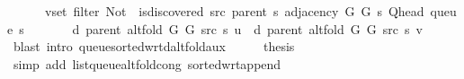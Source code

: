 \begin{isabellebody}
\ \ \ \ \ \ {\isasymforall}v{\isasymin}set\ {\isacharparenleft}{\kern0pt}filter\ {\isacharparenleft}{\kern0pt}Not\ {\isasymcirc}\ is{\isacharunderscore}{\kern0pt}discovered\ src\ {\isacharparenleft}{\kern0pt}parent\ s{\isacharparenright}{\kern0pt}{\isacharparenright}{\kern0pt}\ {\isacharparenleft}{\kern0pt}adjacency\ G{}\ G{}\ s\ {\isacharparenleft}{\kern0pt}Q{\isacharunderscore}{\kern0pt}head\ {\isacharparenleft}{\kern0pt}queue\ s{\isacharparenright}{\kern0pt}{\isacharparenright}{\kern0pt}{\isacharparenright}{\kern0pt}{\isacharparenright}{\kern0pt}{\isachardot}{\kern0pt}\isanewline
\ \ \ \ \ \ \ d\ {\isacharparenleft}{\kern0pt}parent\ {\isacharparenleft}{\kern0pt}alt{\isacharunderscore}{\kern0pt}fold\ G{}\ G{}\ src\ s{\isacharparenright}{\kern0pt}{\isacharparenright}{\kern0pt}\ u\ {\isasymle}\ d\ {\isacharparenleft}{\kern0pt}parent\ {\isacharparenleft}{\kern0pt}alt{\isacharunderscore}{\kern0pt}fold\ G{}\ G{}\ src\ s{\isacharparenright}{\kern0pt}{\isacharparenright}{\kern0pt}\ v{\isachardoublequoteclose}\isanewline
\ \ \ \ \isamarkupfalse%
\ {\isacharparenleft}{\kern0pt}blast\ intro{\isacharcolon}{\kern0pt}\ queue{\isacharunderscore}{\kern0pt}sorted{\isacharunderscore}{\kern0pt}wrt{\isacharunderscore}{\kern0pt}d{\isacharunderscore}{\kern0pt}alt{\isacharunderscore}{\kern0pt}fold{\isacharunderscore}{\kern0pt}aux{\isacharparenright}{\kern0pt}\isanewline
\ \ \isamarkupfalse%
\ \isamarkupfalse%
\ {\isacharquery}{\kern0pt}thesis\ \isanewline
\ \ \ \ \isamarkupfalse%
\ {\isacharparenleft}{\kern0pt}simp\ add{\isacharcolon}{\kern0pt}\ list{\isacharunderscore}{\kern0pt}queue{\isacharunderscore}{\kern0pt}alt{\isacharunderscore}{\kern0pt}fold{\isacharunderscore}{\kern0pt}cong\ sorted{\isacharunderscore}{\kern0pt}wrt{\isacharunderscore}{\kern0pt}append{\isacharparenright}{\kern0pt}\isanewline
{}\isamarkupfalse%
%
\endisatagproof
{\isafoldproof}%
%
\isadelimproof
%
\endisadelimproof
%
\isadelimdocument
%
\endisadelimdocument
%
\isatagdocument
%

\end{isabellebody}

